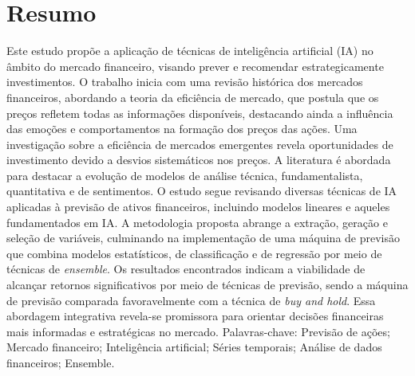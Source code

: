 \chapter*{Resumo}

\noindent 
Este estudo propõe a aplicação de técnicas de inteligência artificial (IA) no âmbito do mercado financeiro, visando prever e recomendar estrategicamente investimentos. O trabalho inicia com uma revisão histórica dos mercados financeiros, abordando a teoria da eficiência de mercado, que postula que os preços refletem todas as informações disponíveis, destacando ainda a influência das emoções e comportamentos na formação dos preços das ações. Uma investigação sobre a eficiência de mercados emergentes revela oportunidades de investimento devido a desvios sistemáticos nos preços.
A literatura é abordada para destacar a evolução de modelos de análise técnica, fundamentalista, quantitativa e de sentimentos. O estudo segue revisando diversas técnicas de IA aplicadas à previsão de ativos financeiros, incluindo modelos lineares e aqueles fundamentados em IA. A metodologia proposta abrange a extração, geração e seleção de variáveis, culminando na implementação de uma máquina de previsão que combina modelos estatísticos, de classificação e de regressão por meio de técnicas de \textit{ensemble}. 
Os resultados encontrados indicam a viabilidade de alcançar retornos significativos por meio de técnicas de previsão, sendo a máquina de previsão comparada favoravelmente com a técnica de \textit{buy and hold}. Essa abordagem integrativa revela-se promissora para orientar decisões financeiras mais informadas e estratégicas no mercado.
\vfill%
\noindent Palavras-chave: Previsão de ações; Mercado financeiro; Inteligência artificial; Séries temporais; Análise de dados financeiros; Ensemble.
